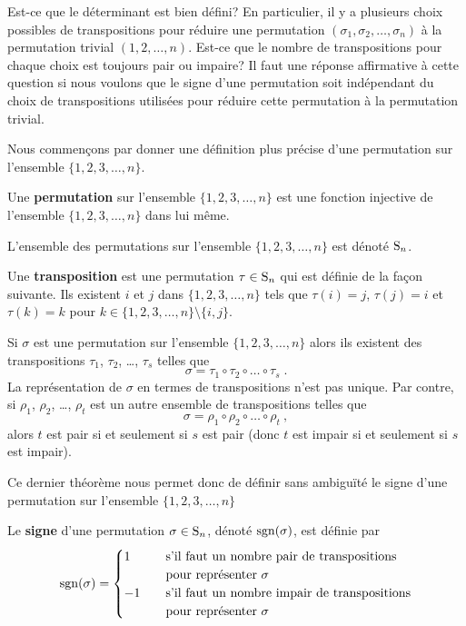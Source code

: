 {Est-ce que le déterminant est bien défini?  En particulier, il y a
plusieurs choix possibles de transpositions pour réduire une
permutation $(\sigma_1, \sigma_2, \ldots, \sigma_n)$ à la permutation
trivial $(1,2,\ldots,n)$.  Est-ce que le nombre de transpositions pour
chaque choix est toujours pair ou impaire?  Il faut une réponse
affirmative à cette question si nous voulons que le signe d'une permutation
soit indépendant du choix de transpositions utilisées pour réduire
cette permutation à la permutation trivial.

Nous commençons par donner une définition plus précise d'une permutation
sur l'ensemble $\{1,2,3,\ldots,n\}$.

\begin{defn}
Une {\bfseries permutation} sur l'ensemble
$\{1,2,3,\ldots,n\}$ est
une fonction injective de l'ensemble $\{1,2,3,\ldots,n\}$ dans lui
même.

L'ensemble des permutations sur l'ensemble $\{1,2,3,\ldots,n\}$ est
dénoté $\mathrm{S}_{n}$.

Une {\bfseries transposition} est une permutation
$\tau \in \mathrm{S}_{n}$ qui est définie de la façon suivante.  Ils existent
$i$ et $j$ dans $\{1,2,3,\ldots,n\}$ tels que $\tau(i) = j$, $\tau(j) = i$ et
$\tau(k) =k$ pour $k \in \{1,2,3,\ldots,n\} \setminus \{i,j\}$.
\end{defn}

\begin{theorem}
Si $\sigma$ est une permutation sur l'ensemble $\{1,2,3,\ldots,n\}$ alors ils
existent des transpositions $\tau_1$, $\tau_2$, \ldots, $\tau_s$ telles que
\[
\sigma = \tau_1 \circ \tau_2 \circ \ldots \circ \tau_s \; .
\]
La représentation de $\sigma$ en termes de transpositions n'est pas unique.
Par contre, si $\rho_1$, $\rho_2$, \ldots, $\rho_t$ est un autre ensemble de
transpositions telles que
\[
\sigma = \rho_1 \circ \rho_2 \circ \ldots \circ \rho_t \ ,
\]
alors $t$ est pair si et seulement si $s$ est pair (donc $t$ est impair si et
seulement si $s$ est impair).
\end{theorem}

Ce dernier théorème nous permet donc de définir sans ambiguïté le signe d'une
permutation sur l'ensemble $\{1,2,3,\ldots,n\}$

\begin{defn} 
Le {\bfseries signe} d'une permutation $\sigma \in \mathrm{S}_{n}$, dénoté
$\operatorname{sgn}(\sigma)$, est définie par
\[
\operatorname{sgn}(\sigma) = \begin{cases}
1 & \quad \text{s'il faut un nombre pair de transpositions} \\
& \quad \text{pour représenter $\sigma$} \\
-1 & \quad \text{s'il faut un nombre impair de transposi\-tions} \\
& \quad \text{pour représenter $\sigma$}
\end{cases}
\]
\end{defn}

}
